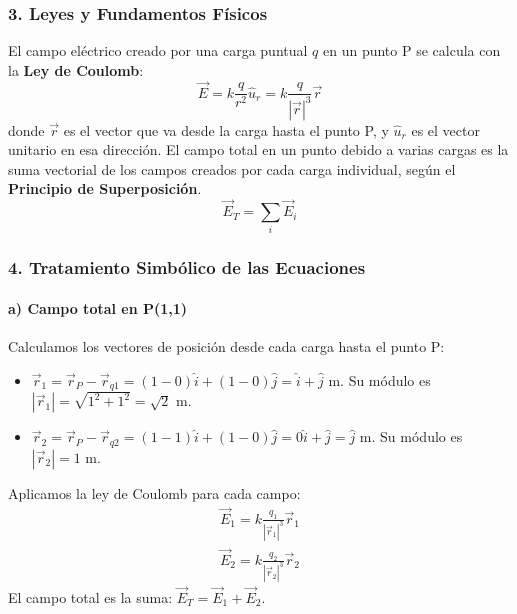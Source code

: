 \subsubsection*{3. Leyes y Fundamentos Físicos}
El campo eléctrico creado por una carga puntual $q$ en un punto P se calcula con la \textbf{Ley de Coulomb}:
$$ \vec{E} = k \frac{q}{r^2} \hat{u}_r = k \frac{q}{|\vec{r}|^3} \vec{r} $$
donde $\vec{r}$ es el vector que va desde la carga hasta el punto P, y $\hat{u}_r$ es el vector unitario en esa dirección.
El campo total en un punto debido a varias cargas es la suma vectorial de los campos creados por cada carga individual, según el \textbf{Principio de Superposición}.
$$ \vec{E}_T = \sum_i \vec{E}_i $$

\subsubsection*{4. Tratamiento Simbólico de las Ecuaciones}
\paragraph*{a) Campo total en P(1,1)}
Calculamos los vectores de posición desde cada carga hasta el punto P:
\begin{itemize}
    \item $\vec{r}_1 = \vec{r}_P - \vec{r}_{q1} = (1-0)\hat{i} + (1-0)\hat{j} = \hat{i} + \hat{j}$ m. Su módulo es $|\vec{r}_1| = \sqrt{1^2+1^2} = \sqrt{2}$ m.
    \item $\vec{r}_2 = \vec{r}_P - \vec{r}_{q2} = (1-1)\hat{i} + (1-0)\hat{j} = 0\hat{i} + \hat{j} = \hat{j}$ m. Su módulo es $|\vec{r}_2| = 1$ m.
\end{itemize}
Aplicamos la ley de Coulomb para cada campo:
\begin{gather}
    \vec{E}_1 = k \frac{q_1}{|\vec{r}_1|^3} \vec{r}_1 \\
    \vec{E}_2 = k \frac{q_2}{|\vec{r}_2|^3} \vec{r}_2
\end{gather}
El campo total es la suma: $\vec{E}_T = \vec{E}_1 + \vec{E}_2$.

